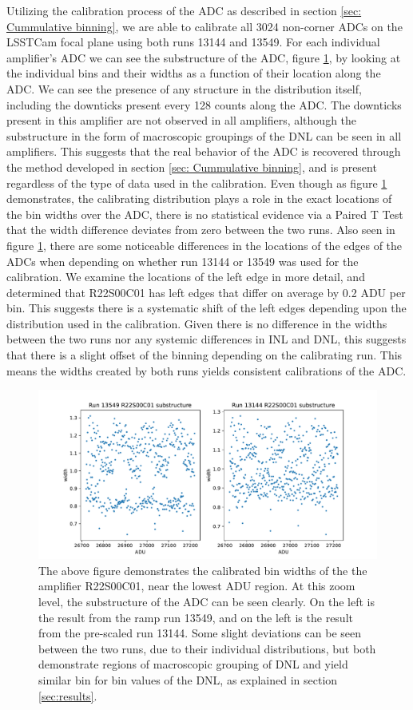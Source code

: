 \documentclass[11pt, letterpaper]{article}
\begin{document}
Utilizing the calibration process of the ADC as described in section \ref{sec: Cummulative binning}, we are able to calibrate all 3024 non-corner ADCs on the LSSTCam focal plane using both runs 13144 and 13549. 
For each individual amplifier’s ADC we can see the substructure of the ADC, figure \ref{fig:substructureplot}, by looking at the individual bins and their widths as a function of their location along the ADC. 
We can see the presence of any structure in the distribution itself, including the downticks present every 128 counts along the ADC. 
The downticks present in this amplifier are not observed in all amplifiers, although the substructure in the form of macroscopic groupings of the DNL can be seen in all amplifiers.
This suggests that the real behavior of the ADC is recovered through the method developed in section \ref{sec: Cummulative binning}, and is present regardless of the type of data used in the calibration.
Even though as figure \ref{fig:substructureplot} demonstrates, the calibrating distribution plays a role in the exact locations of the bin widths over the ADC, there is no statistical evidence via a Paired T Test that the width difference deviates from zero between the two runs.  
Also seen in figure \ref{fig:substructureplot}, there are some noticeable differences in the locations of the edges of the ADCs when depending on whether run 13144 or 13549 was used for the calibration.
We examine the locations of the left edge in more detail, and determined that R22S00C01 has left edges that differ on average by 0.2 ADU per bin. 
This suggests there is a systematic shift of the left edges depending upon the distribution used in the calibration.
Given there is no difference in the widths between the two runs nor any systemic differences in INL and DNL, this suggests that there is a slight offset of the binning depending on the calibrating run.
This means the widths created by both runs yields consistent calibrations of the ADC. 

\begin{figure}
    \centering
    \includegraphics[width=0.5\linewidth]{substructure.pdf}
    \caption{The above figure demonstrates the calibrated bin widths of the the amplifier R22S00C01, near the lowest ADU region. At this zoom level, the substructure of the ADC can be seen clearly. On the left is the result from the ramp run 13549, and on the left is the result from the pre-scaled run 13144.  Some slight deviations can be seen between the two runs, due to their individual distributions, but both demonstrate regions of macroscopic grouping of DNL and yield similar bin for bin values of the DNL, as explained in section \ref{sec:results}.}
    \label{fig:substructureplot}
\end{figure}
\end{document}
